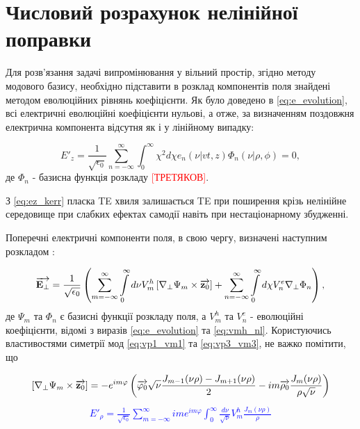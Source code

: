 \section{Числовий розрахунок нелінійної поправки}

Для розв'язання задачі випромінювання у вільний простір, згідно методу 
модового базису, необхідно підставити в розклад компонентів поля знайдені 
методом еволюційних рівнянь коефіцієнти. Як було доведено в 
\eqref{eq:e_evolution}, всі електричні еволюційні коефіцієнти нульові,
а отже, за визначенням \cite{imp:Tretyakov2010} поздовжня електрична
компонента відсутня як і у лінійному випадку:

\begin{equation} \label{eq:ez_kerr}
E'_z = \frac{1}{\sqrt{\epsilon_0}} \sum_{n=-\infty}^{\infty}
\int_0^\infty \chi^2 d \chi e_n (\nu | vt, z) \Phi_n (\nu | \rho, \phi) = 0,
\end{equation}
%
де $ \Phi_n $ - базисна функція розкладу \textcolor{red}{[ТРЕТЯКОВ]}.

З \eqref{eq:ez_kerr} пласка TE хвиля залишається TE при поширення 
крізь нелінійне середовище при слабких ефектах самодії навіть при 
нестаціонарному збудженні.

Поперечні електричні компоненти поля, в свою чергу, визначені наступним 
розкладом \cite{imp:Dumin2000}:

\begin{equation} \begin{aligned}
\overrightarrow{\mathbf E_\perp} = \frac{1}{\sqrt{\epsilon_0}} \left( 
\sum \limits_{m=-\infty}^{\infty} \int \limits_{0}^{\infty} 
d \nu V_m^h \left[  \nabla_\perp \Psi_m  \times  \overrightarrow{\mathbf z_0}  \right] +
\sum \limits_{n=-\infty}^{\infty} \int \limits_{0}^{\infty}
d \chi V_n^e \nabla_\perp \Phi_n \right),
\end{aligned} \end{equation}
%
де $ \Psi_m $ та $ \Phi_n  $ є базисні функції розкладу поля, а $ V_m^h $
та $ V_n^e $ - еволюційні коефіцієнти, відомі з виразів \eqref{eq:e_evolution}
та \eqref{eq:vmh_nl}. Користуючись властивостями симетрії мод 
\eqref{eq:vp1_vm1} та \eqref{eq:vp3_vm3}, не важко помітити, що

%
\textcolor{blue} { \begin{equation*} \begin{aligned}
\left[  \nabla_\perp \Psi_m  \times  \overrightarrow{\mathbf z_0}  \right] = 
- e^{im\varphi} \left( \overrightarrow{\mathbf \varphi_0} \sqrt{\nu} 
\frac{J_{m-1} (\nu \rho) - J_{m+1} (\nu \rho)}{2} - 
i m \overrightarrow{\mathbf \rho_0} \frac{J_m (\nu \rho)}{ \rho \sqrt{\nu}} \right)
\end{aligned} \end{equation*} }
%
\textcolor{blue} { \begin{equation*} \begin{aligned}
E'_\rho = \frac{1}{\sqrt{\epsilon_0}} \sum_{m=-\infty}^{\infty} 
i m e^{im\varphi} \int_{0}^{\infty} \frac{d \nu}{\sqrt{\nu}} 
V_m^h \frac{J_m(\nu \rho)}{\rho}
\end{aligned} \end{equation*} }

